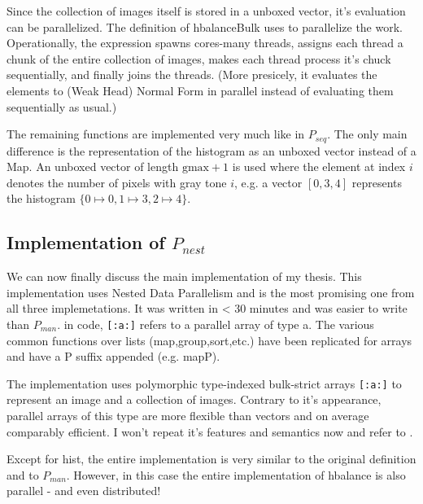 \documentclass{article}
\newcommand{\seq}[0]{$P_{seq}$}
\newcommand{\man}[0]{$P_{man}$}
\newcommand{\ndpn}[0]{$P_{nest}$}
\newcommand{\gmax}[0]{\textrm{gmax}}
\begin{document}
      Since the collection of images itself is stored in a unboxed vector,
      it's evaluation can be parallelized. The definition of hbalanceBulk
      uses \cite{Trinder1998Algorithm} to parallelize the work.
      Operationally, the expression spawns cores-many threads, assigns
      each thread a chunk of the entire collection of images,
      makes each thread process it's chuck sequentially, and finally joins the threads.
      (More presicely, it evaluates the elements to (Weak Head) Normal Form in parallel
      instead of evaluating them sequentially as usual.)
      
      The remaining functions are implemented very much like in \seq.
      The only main difference is the representation of the histogram as an unboxed vector instead of a Map.
      An unboxed vector of length $\gmax+1$ is used where the element at
      index $i$ denotes the number of pixels with gray tone $i$,
      e.g. a vector $ [0,3,4] $ represents the histogram $ \{0 \mapsto 0, 1 \mapsto 3, 2 \mapsto 4 \}$.
      
    \newpage
    
    \subsection{Implementation of \ndpn}
      We can now finally discuss the main implementation of my thesis. This
      implementation uses Nested Data Parallelism \cite{Harness2008} and
      is the most promising one from all three implemetations.
      It was written in < 30 minutes and was easier to write than \man.
      in code, \lstinline|[:a:]| refers to a parallel array of type a. The various common
      functions over lists (map,group,sort,etc.) have been replicated for arrays and have a P suffix appended (e.g. mapP).

      
      
      The implementation uses polymorphic type-indexed bulk-strict arrays \lstinline|[:a:]|
      to represent an image and a collection of images.
      Contrary to it's appearance, parallel arrays of this type are more
      flexible than vectors and on average comparably efficient. I won't
      repeat it's features and semantics now and refer to \cite{Harness2008}.
      
      Except for hist, the entire implementation is very similar to the original definition
      and to \man. However, in this case the entire implementation
      of hbalance is also parallel - and even distributed!
      
\end{document}
